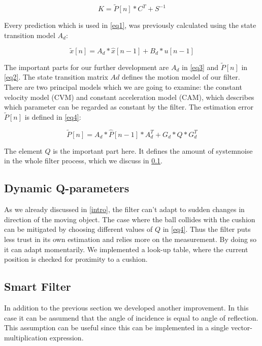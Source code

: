 \documentclass[notitlepage, a4paper, 11pt]{scrartcl}
\begin{document}
\begin{multicols}{2}
\begin{equation} 
    \label{eq2}
    K=\tilde{P}[n]*C^T+S^{-1}
\end{equation}

Every prediction which is used in \cref{eq1}, was previously calculated using the state transition model $A_d$:

\begin{equation} 
    \label{eq3}
    \tilde{x}[n]=A_d*\hat{x}[n-1]+B_d*u[n-1]
\end{equation}

The important parts for our further development are $A_d$ in \cref{eq3} and $\tilde{P}[n]$ in \cref{eq2}. The state transition matrix $Ad$ defines the motion model of our filter.
There are two principal models which we are going to examine: the constant velocity model (CVM) and constant acceleration model (CAM), which describes which parameter can be regarded as constant by the filter.
The estimation error $\tilde{P}[n]$ is defined in \cref{eq4}:

\begin{equation} 
    \label{eq4}
    \tilde{P}[n]=A_d*\hat{P}[n-1]*A_d^T+G_d*Q*G_d^T
\end{equation}

The element $Q$ is the important part here. It defines the amount of systemnoise in the whole filter process, which we discuss in \cref{dynamic-q}.

\subsection{Dynamic Q-parameters} \label{dynamic-q}

As we already discussed in \cref{intro}, the filter can't adapt to sudden changes in direction of the moving object. 
The case where the ball collides with the cushion can be mitigated by choosing different values of $Q$ in \cref{eq4}.
Thus the filter puts less trust in its own estimation and relies more on the measurement. By doing so it can adapt momentarily.
We implemented a look-up table, where the current position is checked for proximity to a cushion.

\subsection{Smart Filter} \label{smart-filter}

In addition to the previous section we developed another improvement. In this case it can be assumend that the angle of incidence is equal to angle of reflection. 
This assumption can be useful since this can be implemented in a single vector-multiplication expression. 


\end{multicols}
\end{document}
